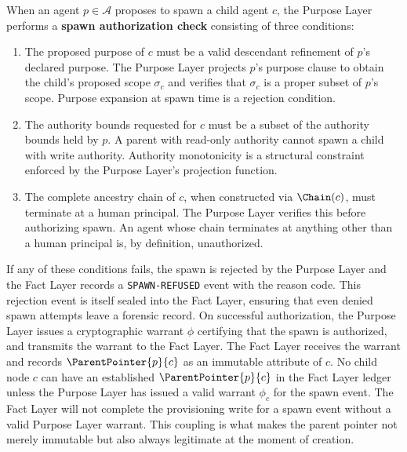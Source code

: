 \begin{definition}
\label{def:spawn_authorization}
When an agent $p \in \mathcal{A}$ proposes to spawn a child agent $c$, the Purpose Layer performs a \textbf{spawn authorization check} consisting of three conditions:

\begin{enumerate}
    \item[(S1) \textbf{Purpose Consistency}] The proposed purpose of $c$ must be a valid descendant refinement of $p$'s declared purpose. The Purpose Layer projects $p$'s purpose clause to obtain the child's proposed scope $\sigma_c$ and verifies that $\sigma_c$ is a proper subset of $p$'s scope. Purpose expansion at spawn time is a rejection condition.
    \item[(S2) \textbf{Authority Monotonicity}] The authority bounds requested for $c$ must be a subset of the authority bounds held by $p$. A parent with read-only authority cannot spawn a child with write authority. Authority monotonicity is a structural constraint enforced by the Purpose Layer's projection function.
    \item[(S3) \textbf{Human Ground}] The complete ancestry chain of $c$, when constructed via $\Chain(c)$, must terminate at a human principal. The Purpose Layer verifies this before authorizing spawn. An agent whose chain terminates at anything other than a human principal is, by definition, unauthorized.
\end{enumerate}
\end{definition}

If any of these conditions fails, the spawn is rejected by the Purpose Layer and the Fact Layer records a \texttt{SPAWN-REFUSED} event with the reason code. This rejection event is itself sealed into the Fact Layer, ensuring that even denied spawn attempts leave a forensic record. On successful authorization, the Purpose Layer issues a cryptographic warrant $\phi$ certifying that the spawn is authorized, and transmits the warrant to the Fact Layer. The Fact Layer receives the warrant and records $\ParentPointer{p}{c}$ as an immutable attribute of $c$. No child node $c$ can have an established $\ParentPointer{p}{c}$ in the Fact Layer ledger unless the Purpose Layer has issued a valid warrant $\phi_c$ for the spawn event. The Fact Layer will not complete the provisioning write for a spawn event without a valid Purpose Layer warrant. This coupling is what makes the parent pointer not merely immutable but also always legitimate at the moment of creation.

